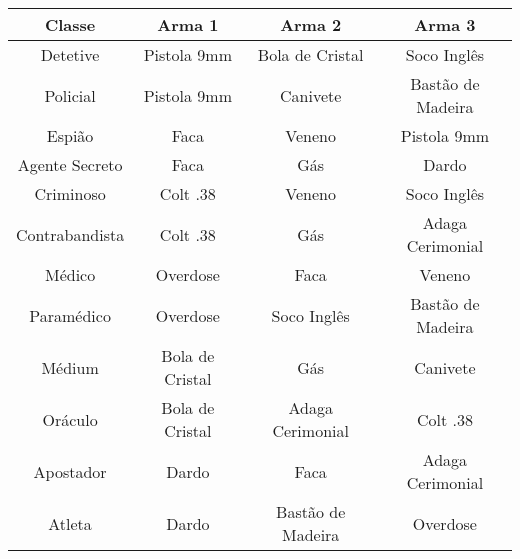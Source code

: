 \documentclass[a4paper, 11pt]{article}
\begin{document}
\begin{center}
\begin{tabular}{ |c||c|c|c| }

\hline

Classe & Arma 1 & Arma 2 & Arma 3 \\

\hline
\hline

Detetive & Pistola 9mm & Bola de Cristal & Soco Inglês \\

\hline

Policial & Pistola 9mm & Canivete & Bastão de Madeira \\

\hline

Espião & Faca & Veneno & Pistola 9mm \\

\hline

Agente Secreto & Faca & Gás & Dardo \\

\hline

Criminoso & Colt .38 & Veneno & Soco Inglês \\

\hline

Contrabandista & Colt .38 & Gás & Adaga Cerimonial \\

\hline

Médico & Overdose & Faca & Veneno \\

\hline

Paramédico & Overdose & Soco Inglês & Bastão de Madeira \\

\hline

Médium & Bola de Cristal & Gás & Canivete \\

\hline

Oráculo & Bola de Cristal & Adaga Cerimonial & Colt .38 \\

\hline

Apostador & Dardo & Faca & Adaga Cerimonial \\

\hline

Atleta & Dardo & Bastão de Madeira & Overdose \\

\hline


\end{tabular}
\end{center}
\end{document}
